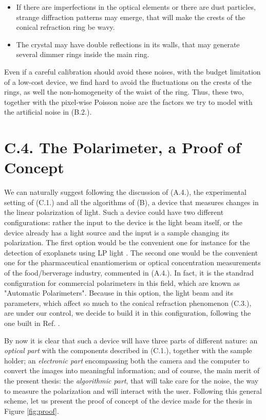 \documentclass[11pt, a4paper, twoside]{article} %
\begin{document}
\begin{itemize}
\item If there are imperfections in the optical elements or there are dust particles, strange diffraction patterns may emerge, that will make the crests of the conical refraction ring be wavy. 
\item The crystal may have double reflections in its walls, that may generate several dimmer rings inside the main
ring.
\end{itemize}
Even if a careful calibration should avoid these noises, with the budget limitation of a low-cost device, we find hard to avoid the fluctuations on the crests of the rings, as well the non-homogeneity of the waist of the ring. Thus, these two, together with the pixel-wise
Poisson noise are the factors we try to model with the artificial noise in (B.2.).

\section*{C.4. The Polarimeter, a Proof of Concept} 
We can naturally suggest following the discussion of (A.4.), the experimental setting of (C.1.) and all the algorithms of (B), a device that measures changes in the linear polarization of light. Such a device could have two different configurations: rather the input to the device is the light beam itself, or the device already has a light source and the input is a sample changing its polarization. The first option would be the convenient one for instance for the detection of exoplanets using LP light \cite{exoplanets}. The second one would be the convenient one for the pharmaceutical enantiomerism or optical concentration measurements of the food/berverage industry, commented in (A.4.). In fact, it is the standrad configuration for commercial polarimeters in this field, which are known as "Automatic Polarimeters". Because in this option, the light beam and its parameters, which affect so much to the conical refraction phenomenon (C.3.), are under our control, we decide to build it in this configuration, following the one built in Ref. \cite{incomplete}.

By now it is clear that such a device will have three parts of different nature: an {\em optical part} with the components described in (C.1.), together with the sample holder; an {\em electronic part} encompassing both the camera and the computer to convert the images into meaningful information; and of course, the main merit of the present thesis: the {\em algorithmic part}, that will take care for the noise, the way to measure the polarization and will interact with the user. Following this general scheme, let us present the proof of concept of the device made for the thesis in Figure \ref{fig:proof}.
\end{document}
